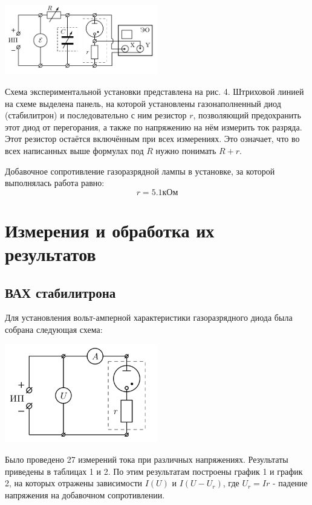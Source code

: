 \documentclass[14pt, a4paper,reqno]{article}
\begin{document}
    \begin{center}
        \includegraphics[width=0.5\textwidth]{images/picture_4.png}
    \end{center}
    Схема экспериментальной установки представлена на рис. 4. Штриховой линией на схеме выделена 
    панель, на которой установлены газонаполненный диод (стабилитрон) и последовательно с ним 
    резистор $r$, позволяющий предохранить этот диод от перегорания, а также по напряжению на нём
    измерить ток разряда. Этот резистор остаётся включённым при всех измерениях. Это означает, что
    во всех написанных выше формулах под $R$ нужно понимать $R + r$.

    Добавочное сопротивление газоразрядной лампы в установке, за которой выполнялась работа равно:
    \[r = 5.1 кОм\]

\section{Измерения и обработка их результатов}

    \subsection{ВАХ стабилитрона}

    Для установления вольт-амперной характеристики газоразрядного диода была собрана следующая схема:
    \begin{center}
        \includegraphics[width=0.5\textwidth]{images/picture_5.png}
    \end{center}
    Было проведено 27 измерений тока при различных напряжениях. Результаты приведены в таблицах 1 и 2.
    По этим результатам построены график 1 и график 2, на которых отражены зависимости $I(U)$ и $I(U - U_r)$,
    где $U_r = Ir$ - падение напряжения на добавочном сопротивлении.
\end{document}
